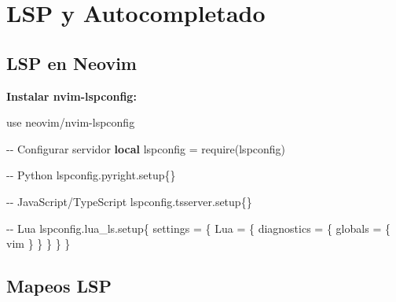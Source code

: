 \documentclass[
  doc,
  floatsintext,
  longtable,
  a4paper,
  nolmodern,
  notxfonts,
  notimes,
  12pt,
  colorlinks=true,linkcolor=blue,citecolor=blue,urlcolor=blue]{apa7}
\newenvironment{Shaded}{\begin{snugshade}}{\end{snugshade}}
\newcommand{\CommentTok}[1]{\textcolor[rgb]{0.37,0.37,0.37}{#1}}
\newcommand{\FunctionTok}[1]{\textcolor[rgb]{0.28,0.35,0.67}{#1}}
\newcommand{\KeywordTok}[1]{\textcolor[rgb]{0.00,0.23,0.31}{\textbf{#1}}}
\newcommand{\NormalTok}[1]{\textcolor[rgb]{0.00,0.23,0.31}{#1}}
\newcommand{\OperatorTok}[1]{\textcolor[rgb]{0.37,0.37,0.37}{#1}}
\newcommand{\StringTok}[1]{\textcolor[rgb]{0.13,0.47,0.30}{#1}}
\newcommand{\VariableTok}[1]{\textcolor[rgb]{0.07,0.07,0.07}{#1}}
\begin{document}
\section{LSP y Autocompletado}\label{lsp-y-autocompletado}

\subsection{LSP en Neovim}\label{lsp-en-neovim}

\textbf{Instalar nvim-lspconfig:}

\begin{Shaded}
\begin{Highlighting}[]
\NormalTok{use }\StringTok{\textquotesingle{}neovim/nvim{-}lspconfig\textquotesingle{}}

\CommentTok{{-}{-} Configurar servidor}
\KeywordTok{local} \VariableTok{lspconfig} \OperatorTok{=} \FunctionTok{require}\OperatorTok{(}\StringTok{\textquotesingle{}lspconfig\textquotesingle{}}\OperatorTok{)}

\CommentTok{{-}{-} Python}
\VariableTok{lspconfig}\OperatorTok{.}\VariableTok{pyright}\OperatorTok{.}\NormalTok{setup}\OperatorTok{\{\}}

\CommentTok{{-}{-} JavaScript/TypeScript}
\VariableTok{lspconfig}\OperatorTok{.}\VariableTok{tsserver}\OperatorTok{.}\NormalTok{setup}\OperatorTok{\{\}}

\CommentTok{{-}{-} Lua}
\VariableTok{lspconfig}\OperatorTok{.}\VariableTok{lua\_ls}\OperatorTok{.}\NormalTok{setup}\OperatorTok{\{}
    \VariableTok{settings} \OperatorTok{=} \OperatorTok{\{}
        \VariableTok{Lua} \OperatorTok{=} \OperatorTok{\{}
            \VariableTok{diagnostics} \OperatorTok{=} \OperatorTok{\{}
                \VariableTok{globals} \OperatorTok{=} \OperatorTok{\{} \StringTok{\textquotesingle{}vim\textquotesingle{}} \OperatorTok{\}}
            \OperatorTok{\}}
        \OperatorTok{\}}
    \OperatorTok{\}}
\OperatorTok{\}}
\end{Highlighting}
\end{Shaded}

\subsection{Mapeos LSP}\label{mapeos-lsp}
\end{document}
